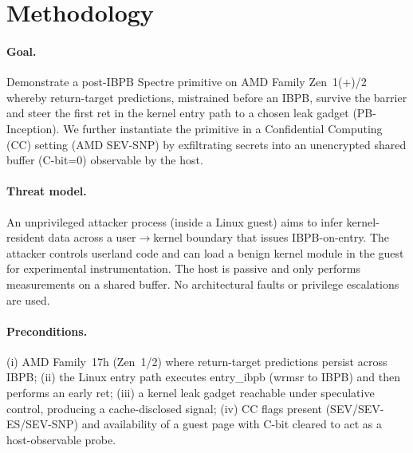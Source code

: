 \documentclass[11pt,a4paper]{article}
\begin{document}
\section{Methodology}

\paragraph{Goal.}
Demonstrate a post-IBPB Spectre primitive on AMD Family Zen~1(+)/2 whereby return-target predictions, mistrained before an IBPB, survive the barrier and steer the first ret in the kernel entry path to a chosen leak gadget (PB-Inception). We further instantiate the primitive in a Confidential Computing (CC) setting (AMD SEV-SNP) by exfiltrating secrets into an unencrypted shared buffer (C-bit=0) observable by the host.

\paragraph{Threat model.}
An unprivileged attacker process (inside a Linux guest) aims to infer kernel-resident data across a user$\rightarrow$kernel boundary that issues IBPB-on-entry. The attacker controls userland code and can load a benign kernel module in the guest for experimental instrumentation. The host is passive and only performs measurements on a shared buffer. No architectural faults or privilege escalations are used.

\paragraph{Preconditions.}
(i) AMD Family~17h (Zen~1/2) where return-target predictions persist across IBPB; (ii) the Linux entry path executes entry\_ibpb (wrmsr to IBPB) and then performs an early ret; (iii) a kernel leak gadget reachable under speculative control, producing a cache-disclosed signal; (iv) CC flags present (SEV/SEV-ES/SEV-SNP) and availability of a guest page with C-bit cleared to act as a host-observable probe.%
\end{document}

